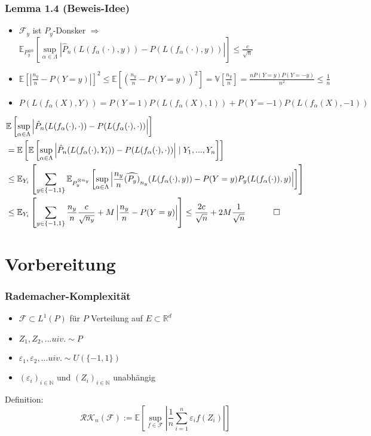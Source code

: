 \documentclass{beamer}
\newcommand{\R}{\mathbb{R}} %
\newcommand{\N}{\mathbb{N}} %
\newcommand{\E}{\mathbb{E}} %
\newcommand{\F}{\mathcal{F}}
\begin{document}
	\begin{frame}
		\frametitle{Lemma 1.4 (Beweis-Idee)}
		\begin{itemize}
			\item $\F_y$ ist $P_y$-Donsker $\Rightarrow$ {\small$ \E_{P_y^{\otimes n}}\left[ \sup\limits_{\alpha \in \Lambda} \left|\hat{P}_n(L(f_\alpha(\cdot),y))-P(L(f_\alpha(\cdot),y))\right| \right] \leq \frac{c}{\sqrt{n}}$}
			\item {\footnotesize $\E\left[ \left| \frac{n_y}{n} -P(Y=y) \right| \right]^2 \leq \E\left[ \left( \frac{n_y}{n} -P(Y=y) \right)^2 \right] = \mathbb{V}[\frac{n_y}{n}] = \frac{nP(Y=y)P(Y=-y)}{n^2} \leq \frac{1}{n}$}
			\item {\small$P(L(f_\alpha(X),Y)) = P(Y=1) P(L(f_\alpha(X),1)) + P(Y=-1) P(L(f_\alpha(X),-1))$}
		\end{itemize}
		\pause
		{\small
		\begin{align*}
		& \E\left[ \sup\limits_{\alpha \in \Lambda} \left| \hat{P}_n(L(f_\alpha(\cdot),\cdot))-P(L(f_\alpha(\cdot),\cdot)) \right| \right]\\
		& = \E\left[ \E\left[ \sup\limits_{\alpha \in \Lambda} \left| \hat{P}_n(L(f_\alpha(\cdot),Y_i))-P(L(f_\alpha(\cdot),\cdot)) \right| \mid Y_1,...,Y_n \right] \right]\\
		& \leq \E_{Y_i}\left[ \sum\limits_{y \in \{-1,1\}} \E_{P_y^{\otimes n_y}}\left[ \sup\limits_{\alpha \in \Lambda} \left| \frac{n_y}{n} \widehat{(P_y)}_{n_y}(L(f_\alpha(\cdot),y))-P(Y=y)P_{y}(L(f_\alpha(\cdot)), y) \right| \right] \right]\\
		& \leq \E_{Y_i}\left[ \sum\limits_{y \in \{-1,1\}} \frac{n_y}{n} \frac{c}{\sqrt{n_y}} + M \left| \frac{n_y}{n} - P(Y=y) \right| \right] \leq \frac{2c}{\sqrt{n}} + 2M \frac{1}{\sqrt{n}} \ \ \ \ \qed
		\end{align*}
		}
	\end{frame}



	\section{Vorbereitung}
	
	\begin{frame}
		\frametitle{Rademacher-Komplexität}
		\begin{itemize}
			\item $\F \subset L^1(P)$ für $P$ Verteilung auf $E \subset \R^d$
			\item $Z_1,Z_2,...uiv. \sim P$
			\item $\varepsilon_1,\varepsilon_2,...uiv. \sim U(\{-1,1\})$
			\item $(\varepsilon_i)_{i \in \N}$ und $(Z_i)_{i \in \N}$ unabhängig
		\end{itemize}
		\hfill\break
		Definition:\\
		$$
		\mathcal{RK}_n(\F) := \E\left[ \sup\limits_{f \in \F} \left| \frac{1}{n} \sum\limits_{i=1}^n \varepsilon_i f(Z_i) \right| \right]
		$$
	\end{frame}
\end{document}
